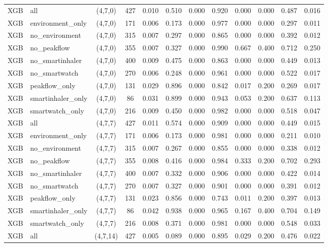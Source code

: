 \begin{longtable}{llcccccccccc}
XGB & all & (4,7,0) & 427 & 0.010 & 0.510 & 0.000 & 0.920 & 0.000 & 0.000 & 0.487 & 0.016 \\
XGB & environment\_only & (4,7,0) & 171 & 0.006 & 0.173 & 0.000 & 0.977 & 0.000 & 0.000 & 0.297 & 0.011 \\
XGB & no\_environment & (4,7,0) & 315 & 0.007 & 0.297 & 0.000 & 0.865 & 0.000 & 0.000 & 0.392 & 0.012 \\
XGB & no\_peakflow & (4,7,0) & 355 & 0.007 & 0.327 & 0.000 & 0.990 & 0.667 & 0.400 & 0.712 & 0.250 \\
XGB & no\_smartinhaler & (4,7,0) & 400 & 0.009 & 0.475 & 0.000 & 0.863 & 0.000 & 0.000 & 0.449 & 0.013 \\
XGB & no\_smartwatch & (4,7,0) & 270 & 0.006 & 0.248 & 0.000 & 0.961 & 0.000 & 0.000 & 0.522 & 0.017 \\
XGB & peakflow\_only & (4,7,0) & 131 & 0.029 & 0.896 & 0.000 & 0.842 & 0.017 & 0.200 & 0.269 & 0.017 \\
XGB & smartinhaler\_only & (4,7,0) & 86 & 0.031 & 0.899 & 0.000 & 0.943 & 0.053 & 0.200 & 0.637 & 0.113 \\
XGB & smartwatch\_only & (4,7,0) & 216 & 0.009 & 0.450 & 0.000 & 0.982 & 0.000 & 0.000 & 0.518 & 0.047 \\
XGB & all & (4,7,7) & 427 & 0.011 & 0.574 & 0.000 & 0.909 & 0.000 & 0.000 & 0.449 & 0.015 \\
XGB & environment\_only & (4,7,7) & 171 & 0.006 & 0.173 & 0.000 & 0.981 & 0.000 & 0.000 & 0.211 & 0.010 \\
XGB & no\_environment & (4,7,7) & 315 & 0.007 & 0.267 & 0.000 & 0.855 & 0.000 & 0.000 & 0.338 & 0.012 \\
XGB & no\_peakflow & (4,7,7) & 355 & 0.008 & 0.416 & 0.000 & 0.984 & 0.333 & 0.200 & 0.702 & 0.293 \\
XGB & no\_smartinhaler & (4,7,7) & 400 & 0.007 & 0.332 & 0.000 & 0.906 & 0.000 & 0.000 & 0.422 & 0.014 \\
XGB & no\_smartwatch & (4,7,7) & 270 & 0.007 & 0.327 & 0.000 & 0.901 & 0.000 & 0.000 & 0.391 & 0.012 \\
XGB & peakflow\_only & (4,7,7) & 131 & 0.023 & 0.856 & 0.000 & 0.743 & 0.011 & 0.200 & 0.397 & 0.013 \\
XGB & smartinhaler\_only & (4,7,7) & 86 & 0.042 & 0.938 & 0.000 & 0.965 & 0.167 & 0.400 & 0.704 & 0.149 \\
XGB & smartwatch\_only & (4,7,7) & 216 & 0.008 & 0.371 & 0.000 & 0.981 & 0.000 & 0.000 & 0.548 & 0.033 \\
XGB & all & (4,7,14) & 427 & 0.005 & 0.089 & 0.000 & 0.895 & 0.029 & 0.200 & 0.476 & 0.022 \\

\end{longtable}
